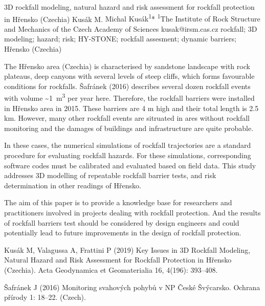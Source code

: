 \abstract
{3D rockfall modeling, natural hazard and risk assessment for rockfall protection in Hřensko (Czechia)} 
{Kusák M.} 
{Michal Kusák\textsuperscript{1}*} 
{\POtag} 
{
\textsuperscript{1}The Institute of Rock Structure and Mechanics of the Czech Academy of Sciences
}
{kusak@irsm.cas.cz}  %
{rockfall; 3D modeling; hazard; risk; HY-STONE; rockfall assesment; dynamic barriers; Hřensko (Czechia)}
{The Hřensko area (Czechia) is characterised by sandstone landscape with rock plateaus, deep canyons with several levels of steep cliffs, which forms favourable conditions for rockfalls. Šafránek (2016) describes several dozen rockfall events with volume \textasciitilde1~m\textsuperscript{3} per year here. Therefore, the rockfall barriers were installed in Hřensko area in 2015. These barriers are 4 m high and their total length is 2.5 km. However, many other rockfall events are sitruated in ares without rockfall monitoring and the damages of buildings and infrastructure are quite probable. 

In these cases, the numerical simulations of rockfall trajectories are a standard procedure for evaluating rockfall hazards. For these simulations, corresponding software codes must be calibrated and evaluated based on field data. This study addresses 3D modelling of repeatable rockfall barrier tests, and risk determination in other readings of Hřensko.

The aim of this paper is to provide a knowledge base for researchers and practitioners involved in projects dealing with rockfall protection. And the results of rockfall barriers test should be considered by design engineers and could potentially lead to future improvements in the design of rockfall protection.
}
{Kusák M, Valagussa A, Frattini P (2019) Key Issues in 3D Rockfall Modeling, Natural Hazard and Risk Assessment for Rockfall Protection in Hřensko (Czechia). Acta Geodynamica et Geomaterialia 16, 4(196): 393–408.

Šafránek J (2016) Monitoring svahových pohybů v NP České Švýcarsko. Ochrana přírody 1: 18–22. (Czech).
}

